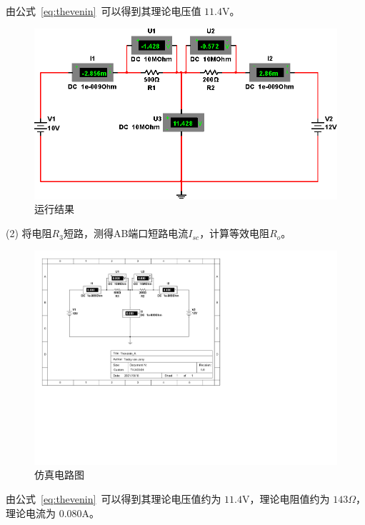 \documentclass[12pt]{SEU-Circuit-Report}
\begin{document}
            \expexpect

            由公式~\eqref{eq:thevenin}~可以得到其理论电压值 $11.4\mathrm{V}$。

            \emptyline
            \expsimulate

            \begin{figure}[htbp]
                \centering
                \includegraphics[width=.8\linewidth]{fig/exp3_result.eps}
                \caption{运行结果}
                \label{fig:3result}
            \end{figure}

            \newpage
        
            (2) 将电阻$R_3$短路，测得AB端口短路电流$I_{sc}$，计算等效电阻$R_o$。
            \begin{figure}[htbp]
                \centering
                \includegraphics[width=.8\linewidth]{Thevenin_A.pdf}
                \caption{仿真电路图}
                \label{fig:4circuit}
            \end{figure}

            \expexpect

            由公式~\eqref{eq:thevenin}~可以得到其理论电压值约为 $11.4\mathrm{V}$，理论电阻值约为 $143\Omega$，理论电流为 $0.080\mathrm{A}$。
\end{document}
